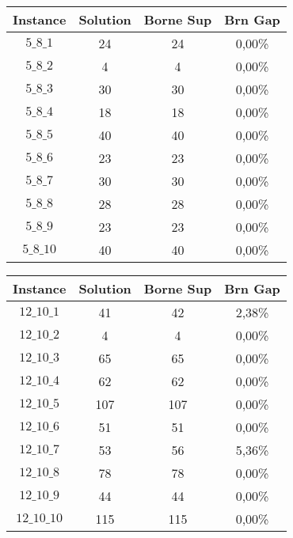 \documentclass[a4paper, 11pt]{article} %
\begin{document}
\begin{center}
\begin{figure}[H]
   \begin{minipage}[c]{.46\linewidth}
      \begin{tabular}{|c|c|c|c|}
      \hline 
        Instance & Solution & Borne Sup & Brn Gap  \\ \hline
$5\_8\_1$ & 24 &  24 &  0,00\% \\ \hline
$5\_8\_2$ & 4 & 4 & 0,00\% \\ \hline
$5\_8\_3$ & 30 &  30 &  0,00\% \\ \hline
$5\_8\_4$ & 18 &  18 &  0,00\% \\ \hline
$5\_8\_5$ & 40 &  40 &  0,00\% \\ \hline
$5\_8\_6$ & 23 &  23 &  0,00\% \\ \hline
$5\_8\_7$ & 30 &  30 &  0,00\% \\ \hline
$5\_8\_8$ & 28 &  28 &  0,00\% \\ \hline
$5\_8\_9$ & 23 &  23 &  0,00\% \\ \hline
$5\_8\_10$ & 40 &  40 &  0,00\% \\ \hline
      \end{tabular}
   \end{minipage} \hfill
   \begin{minipage}[c]{.46\linewidth}
      \begin{tabular}{|c|c|c|c|}
      \hline 
        Instance & Solution & Borne Sup & Brn Gap  \\ \hline
$12\_10\_1$ & 41 &  42 &  2,38\% \\ \hline
$12\_10\_2$ & 4 & 4 & 0,00\% \\ \hline
$12\_10\_3$ & 65 &  65 &  0,00\% \\ \hline
$12\_10\_4$ & 62 &  62 &  0,00\% \\ \hline
$12\_10\_5$ & 107 & 107 & 0,00\% \\ \hline
$12\_10\_6$ & 51 &  51 &  0,00\% \\ \hline
$12\_10\_7$ & 53 &  56 &  5,36\% \\ \hline
$12\_10\_8$ & 78 &  78 &  0,00\% \\ \hline
$12\_10\_9$ & 44 &  44 &  0,00\% \\ \hline
$12\_10\_10$ & 115 & 115 & 0,00\% \\ \hline
      \end{tabular}
   \end{minipage}
\end{figure}


\end{center}
\end{document}
